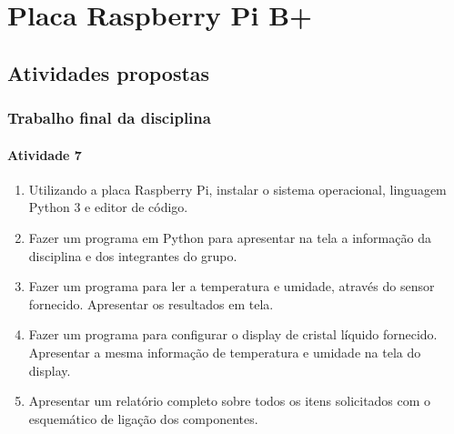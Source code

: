 \documentclass[
	12pt,				%
	openright,			%
  oneside,     %
	a4paper,			%
	english,			%
	french,				%
	spanish,			%
	brazil				%
	]{abntex2}
\begin{document}


%
%

\chapter{Placa Raspberry Pi B+} %
\label{cha:7-placa_raspberry_pi}

\section{Atividades propostas} %
\label{sec:RaspberryPi-atividades_propostas}

\subsection*{Trabalho final da disciplina}

\subsubsection*{Atividade 7}

\begin{enumerate}
  \item Utilizando a placa Raspberry Pi, instalar o sistema operacional, linguagem Python 3 e editor de código.
  \item Fazer um programa em Python para apresentar na tela a informação da disciplina e dos integrantes do grupo.
  \item Fazer um programa para ler a temperatura e umidade, através do sensor fornecido. Apresentar os resultados em tela.
  \item Fazer um programa para configurar o display de cristal líquido fornecido. Apresentar a mesma informação de temperatura e umidade na tela do display.
  \item Apresentar um relatório completo sobre todos os itens solicitados com o esquemático de ligação dos componentes.
\end{enumerate}
\end{document}
